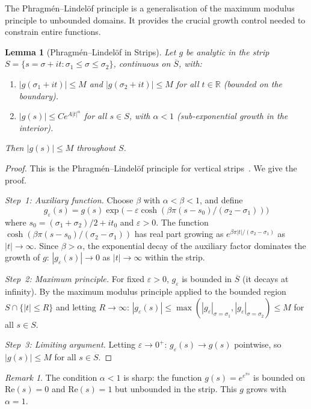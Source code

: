 \documentclass[11pt,a4paper]{article}
\theoremstyle{plain}
\newtheorem{lemma}[theorem]{Lemma}
\theoremstyle{remark}
\newtheorem{remark}[theorem]{Remark}
\newcommand{\R}{\mathbb{R}}
\begin{document}
The Phragm\'en--Lindel\"of principle is a generalisation of the maximum
modulus principle to unbounded domains.  It provides the crucial growth
control needed to constrain entire functions.

\begin{lemma}[Phragm\'en--Lindel\"of in Strips]\label{lem:phragmen-lindelof}
Let $g$ be analytic in the strip $S=\{s=\sigma+it:\sigma_1\leq\sigma\leq\sigma_2\}$,
continuous on $\overline{S}$, with:
\begin{enumerate}[nosep,label=(\roman*)]
  \item $|g(\sigma_1+it)|\leq M$ and $|g(\sigma_2+it)|\leq M$ for all $t\in\R$
        (bounded on the boundary).
  \item $|g(s)|\leq Ce^{A|t|^\alpha}$ for all $s\in S$, with $\alpha<1$
        (sub-exponential growth in the interior).
\end{enumerate}
Then $|g(s)|\leq M$ throughout $S$.
\end{lemma}

\begin{proof}
This is the Phragm\'en--Lindel\"of principle for vertical
strips~\cite{titchmarsh1986,phragmen-lindelof1908}.  We give the
proof.

\emph{Step~1: Auxiliary function.}
Choose $\beta$ with $\alpha<\beta<1$, and define
\[
  g_\varepsilon(s)=g(s)\exp\bigl(-\varepsilon\cosh(\beta\pi(s-s_0)/(\sigma_2-\sigma_1))\bigr)
\]
where $s_0=(\sigma_1+\sigma_2)/2+it_0$ and $\varepsilon>0$.  The function
$\cosh(\beta\pi(s-s_0)/(\sigma_2-\sigma_1))$ has real part growing as
$e^{\beta\pi|t|/(\sigma_2-\sigma_1)}$ as $|t|\to\infty$.  Since $\beta>\alpha$,
the exponential decay of the auxiliary factor dominates the growth of $g$:
$|g_\varepsilon(s)|\to 0$ as $|t|\to\infty$ within the strip.

\emph{Step~2: Maximum principle.}
For fixed $\varepsilon>0$, $g_\varepsilon$ is bounded in $\overline{S}$
(it decays at infinity).  By the maximum modulus principle applied to
the bounded region $S\cap\{|t|\leq R\}$ and letting $R\to\infty$:
$|g_\varepsilon(s)|\leq\max(|g_\varepsilon|_{\sigma=\sigma_1},
|g_\varepsilon|_{\sigma=\sigma_2})\leq M$ for all $s\in S$.

\emph{Step~3: Limiting argument.}
Letting $\varepsilon\to 0^+$: $g_\varepsilon(s)\to g(s)$ pointwise,
so $|g(s)|\leq M$ for all $s\in S$.
\end{proof}

\begin{remark}
The condition $\alpha<1$ is sharp: the function $g(s)=e^{e^{\pi s}}$
is bounded on $\mathrm{Re}(s)=0$ and $\mathrm{Re}(s)=1$ but unbounded
in the strip.  This $g$ grows with $\alpha=1$.
\end{remark}
\end{document}
